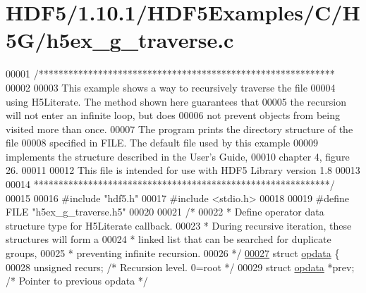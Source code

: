 \hypertarget{_h_d_f5_21_810_81_2_h_d_f5_examples_2_c_2_h5_g_2h5ex__g__traverse_8c_source}{}\section{H\+D\+F5/1.10.1/\+H\+D\+F5\+Examples/\+C/\+H5\+G/h5ex\+\_\+g\+\_\+traverse.c}
\label{_h_d_f5_21_810_81_2_h_d_f5_examples_2_c_2_h5_g_2h5ex__g__traverse_8c_source}

\begin{DoxyCode}
00001 \textcolor{comment}{/************************************************************}
00002 \textcolor{comment}{}
00003 \textcolor{comment}{  This example shows a way to recursively traverse the file}
00004 \textcolor{comment}{  using H5Literate.  The method shown here guarantees that}
00005 \textcolor{comment}{  the recursion will not enter an infinite loop, but does}
00006 \textcolor{comment}{  not prevent objects from being visited more than once.}
00007 \textcolor{comment}{  The program prints the directory structure of the file}
00008 \textcolor{comment}{  specified in FILE.  The default file used by this example}
00009 \textcolor{comment}{  implements the structure described in the User's Guide,}
00010 \textcolor{comment}{  chapter 4, figure 26.}
00011 \textcolor{comment}{}
00012 \textcolor{comment}{  This file is intended for use with HDF5 Library version 1.8}
00013 \textcolor{comment}{}
00014 \textcolor{comment}{ ************************************************************/}
00015 
00016 \textcolor{preprocessor}{#include "hdf5.h"}
00017 \textcolor{preprocessor}{#include <stdio.h>}
00018 
00019 \textcolor{preprocessor}{#define FILE       "h5ex\_g\_traverse.h5"}
00020 
00021 \textcolor{comment}{/*}
00022 \textcolor{comment}{ * Define operator data structure type for H5Literate callback.}
00023 \textcolor{comment}{ * During recursive iteration, these structures will form a}
00024 \textcolor{comment}{ * linked list that can be searched for duplicate groups,}
00025 \textcolor{comment}{ * preventing infinite recursion.}
00026 \textcolor{comment}{ */}
\hyperlink{structopdata}{00027} \textcolor{keyword}{struct }\hyperlink{structopdata}{opdata} \{
00028     \textcolor{keywordtype}{unsigned}        recurs;         \textcolor{comment}{/* Recursion level.  0=root */}
00029     \textcolor{keyword}{struct }\hyperlink{structopdata}{opdata}   *prev;          \textcolor{comment}{/* Pointer to previous opdata */}

\end{DoxyCode}
